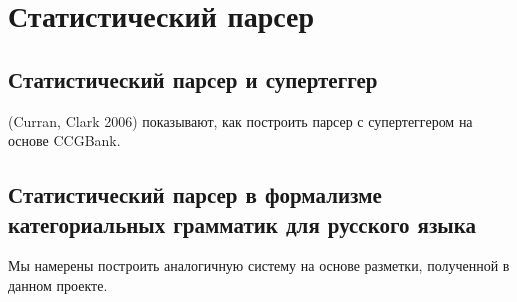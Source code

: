 \chapter{Статистический парсер}

\section{Статистический парсер и супертеггер}

(Curran, Clark 2006) показывают, как построить парсер с супертеггером на основе CCGBank. 

\section{Статистический парсер в формализме категориальных грамматик для русского языка}

Мы намерены построить аналогичную систему на основе разметки, полученной в данном проекте.
